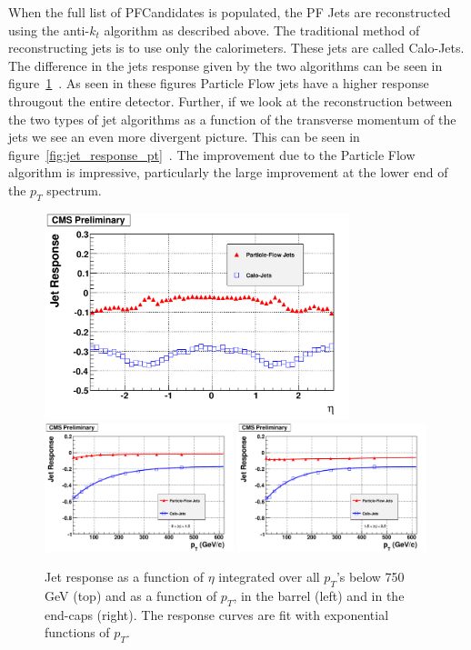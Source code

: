When the full list of PFCandidates is populated, the PF Jets are reconstructed using the anti-$k_t$ algorithm as described above.  The traditional method of reconstructing jets is to use only the calorimeters.  These jets are called Calo-Jets. The difference in the jets response given by the two algorithms can be seen in figure~\ref{fig:jet_response}~\cite{particleflow}. As seen in these figures Particle Flow jets have a higher response througout the entire detector.  Further, if we look at the reconstruction between the two types of jet algorithms as a function of the transverse momentum of the jets we see an even more divergent picture.  This can be seen in figure~\ref{fig:jet_response_pt}~\cite{particleflow}. The improvement due to the Particle Flow algorithm is impressive, particularly the large improvement at the lower end of the $p_T$ spectrum.

\begin{figure}
\begin{center}
\includegraphics[width=0.79\textwidth]{Reconstruction/Figure_008-a-rotated90.pdf}\\
\includegraphics[width=0.49\textwidth]{Reconstruction/Figure_008-b-rotated90.pdf}
\includegraphics[width=0.49\textwidth]{Reconstruction/Figure_008-c-rotated90.pdf}
\caption{Jet response as a function of $\eta$ integrated over all $p_T$'s below 750 GeV (top) and as a function of $p_T$, in the barrel (left) and in the end-caps (right). The response curves are fit with exponential functions of $p_T$.~\cite{particleflow}}
\label{fig:jet_response}
\end{center}
\end{figure}


